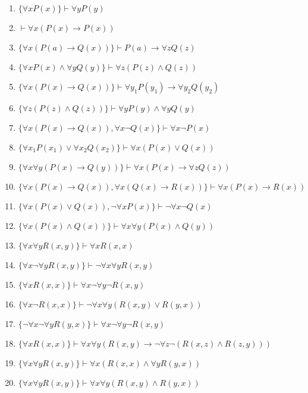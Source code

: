 \begin{enumerate}
    \item \(\{\forall x P(x)\} \vdash \forall y P(y)\)
    \item \(\vdash \forall x (P(x) \rightarrow P(x))\)
    \item \(\{\forall x (P(a) \rightarrow Q(x))\} \vdash P(a) \rightarrow \forall z Q(z)\)
    \item \(\{\forall x P(x) \wedge \forall y Q(y)\} \vdash \forall z (P(z) \wedge Q(z))\)
    \item \(\{\forall x (P(x) \rightarrow Q(x))\} \vdash \forall y_1 P(y_1) \rightarrow \forall y_2 Q(y_2)\)
    \item \(\{\forall z (P(z) \wedge Q(z))\} \vdash \forall y P(y) \wedge \forall y Q(y)\)
    \item \(\{\forall x (P(x) \rightarrow Q(x)), \forall x \neg Q(x)\} \vdash \forall x \neg P(x)\)
    \item \(\{\forall x_1 P(x_1) \vee \forall x_2 Q(x_2)\} \vdash \forall x (P(x) \vee Q(x))\)
    \item \(\{\forall x \forall y (P(x) \rightarrow Q(y))\} \vdash \forall x (P(x) \rightarrow \forall z Q(z))\)
    \item \(\{\forall x (P(x) \rightarrow Q(x)), \forall x (Q(x) \rightarrow R(x))\} \vdash \forall x (P(x) \rightarrow R(x))\)
    \item \(\{\forall x (P(x) \vee Q(x)), \neg \forall x P(x)\} \vdash \neg \forall x \neg Q(x)\)
    \item \(\{\forall x (P(x) \wedge Q(x))\} \vdash \forall x \forall y (P(x) \wedge Q(y))\)
    \item \(\{\forall x \forall y R(x,y)\} \vdash \forall x R(x,x)\)
    \item \(\{\forall x \neg \forall y R(x,y)\} \vdash \neg \forall x \forall y R(x,y)\)
    \item \(\{\forall x R(x,x)\} \vdash \forall x \neg \forall y \neg R(x,y)\)
    \item \(\{\forall x \neg R(x,x)\} \vdash \neg \forall x \forall y (R(x,y) \vee R(y,x))\)
    \item \(\{\neg \forall x \neg \forall y R(y,x)\} \vdash \forall x \neg \forall y \neg R(x,y)\)
    \item \(\{\forall x R(x,x)\} \vdash \forall x \forall y (R(x,y) \rightarrow \neg \forall z \neg (R(x,z) \wedge R(z,y)))\)
    \item \(\{\forall x \forall y R(x,y)\} \vdash \forall x (R(x,x) \wedge \forall y R(y,x))\)
    \item \(\{\forall x \forall y R(x,y)\} \vdash \forall x \forall y (R(x,y) \wedge R(y,x))\)

\end{enumerate}
